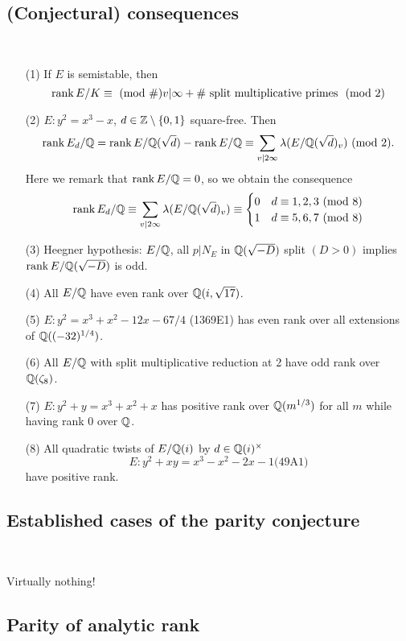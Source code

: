 \documentclass[12pt,amsfont]{amsart}
\begin{document}
\subsection{(Conjectural) consequences}

{\ }
\begin{enumerate}
\item[(1)]
If $E$ is semistable, then 
\[\rank E/K \equiv \pmod \# v | \infty + \# \text{ split multiplicative primes } \pmod{2}\]
\item[(2)]
$E: y^2 = x^3 - x$, $d \in {\mathbb Z} \setminus \{0,1\}$ square-free. Then
\[ \rank E_d/\bQ = \rank E/\bQ(\sqrt{d}) - \rank E/\bQ \equiv \sum_{v | 2 \infty} \lambda(E/\bQ(\sqrt{d})_v) \pmod{2}. \]
Here we remark that $\operatorname{rank} E/{\mathbb Q} = 0$, so we obtain the consequence
\[\rank E_d/\bQ \equiv \sum_{v | 2 \infty} \lambda(E/\bQ(\sqrt{d})_v) \equiv \begin{cases} 0 & d \equiv 1,2,3 \pmod{8} \\ 1 & d \equiv 5,6,7 \pmod{8} \end{cases} \]
\item[(3)]
Heegner hypothesis: $E/{\mathbb Q}$, all $p | N_E$ in ${\mathbb Q}(\sqrt{-D})$ split $(D > 0)$ implies $\operatorname{rank} E/{\mathbb Q}(\sqrt{-D})$ is odd.
\item[(4)]
All $E/{\mathbb Q}$ have even rank over ${\mathbb Q}(i, \sqrt{17})$. 
\item[(5)]
$E: y^2 = x^3 + x^2 - 12x - 67/4$ (1369E1) has even rank over all extensions of ${\mathbb Q}((-32)^{1/4})$. 
\item[(6)]
All $E/{\mathbb Q}$ with split multiplicative reduction at 2 have odd rank over ${\mathbb Q}(\zeta_8)$. 
\item[(7)]
$E: y^2 + y = x^3 + x^2 + x$ has positive rank over ${\mathbb Q}(m^{1/3})$ for all $m$ while having rank 0 over ${\mathbb Q}$. 
\item[(8)]
All quadratic twists of $E/{\mathbb Q}(i)$ by $d \in {\mathbb Q}(i)^\times$
\[E: y^2 + xy = x^3 - x^2 - 2x - 1 \text{(49A1)} \]
have positive rank.  
\end{enumerate}

\subsection{Established cases of the parity conjecture}
{\ }

Virtually nothing!

\subsection{Parity of analytic rank}
{\ }
\end{document}
